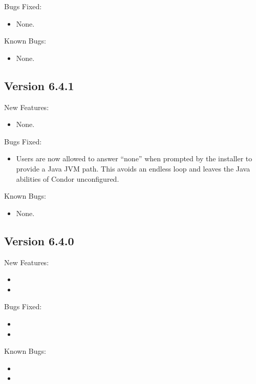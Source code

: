 \noindent Bugs Fixed:
\begin{itemize}
\item None.

\end{itemize}
\noindent Known Bugs:
\begin{itemize}

\item None.

\end{itemize}

\subsection{\label{sec:New-6-4-1}Version 6.4.1}
\noindent New Features:
\begin{itemize}

\item None.

\end{itemize}

\noindent Bugs Fixed:
\begin{itemize}

\item Users are now allowed to answer ``none'' when prompted by the
installer to provide a Java JVM path. This avoids an endless loop and
leaves the Java abilities of Condor unconfigured.

\end{itemize}

\noindent Known Bugs:
\begin{itemize}

\item None.

\end{itemize}

\subsection{\label{sec:New-6-4-0}Version 6.4.0}
\noindent New Features:
\begin{itemize}

\item 

\item 

\end{itemize}

\noindent Bugs Fixed:
\begin{itemize}

\item 

\item 

\end{itemize}

\noindent Known Bugs:
\begin{itemize}
\item 

\item 

\end{itemize}


